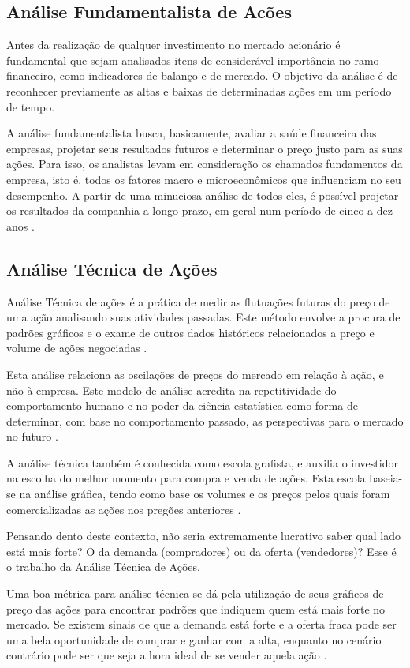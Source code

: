 \subsection{Análise Fundamentalista de Acões}
Antes da realização de qualquer investimento no mercado acionário é fundamental que sejam analisados itens de considerável importância no ramo financeiro, como indicadores de balanço e de mercado. O objetivo da análise é de reconhecer previamente as altas e baixas de determinadas ações em um período de tempo.

A análise fundamentalista busca, basicamente, avaliar a saúde financeira das empresas, projetar seus resultados futuros e determinar o preço justo para as suas ações. Para isso, os analistas levam em consideração os chamados fundamentos da empresa, isto é, todos os fatores macro e microeconômicos que influenciam no seu desempenho. A partir de uma minuciosa análise de todos eles, é possível projetar os resultados da companhia a longo prazo, em geral num período de cinco a dez anos \cite{exame}.

\subsection{Análise Técnica de Ações}\label{ch:analise-tecnica}
Análise Técnica de ações é a prática de medir as flutuações futuras do preço de uma ação analisando suas atividades passadas. Este método envolve a procura de padrões gráficos e o exame de outros dados históricos relacionados a preço e volume de ações negociadas \cite{tororadar}.
 
Esta análise relaciona as oscilações de preços do mercado em relação à ação, e não à empresa. Este modelo de análise acredita na repetitividade do comportamento humano e no poder da ciência estatística como forma de determinar, com base no comportamento passado, as perspectivas para o mercado no futuro \cite{pereira}.

A análise técnica também é conhecida como escola grafista, e auxilia o investidor na escolha do melhor momento para compra e venda de ações. Esta escola baseia-se na análise gráfica, tendo como base os volumes e os preços pelos quais foram comercializadas as ações nos pregões anteriores \cite{fortuna}.

Pensando dento deste contexto, não seria extremamente lucrativo saber qual lado está mais forte? O da demanda (compradores) ou da oferta (vendedores)? Esse é o trabalho da Análise Técnica de Ações.

Uma boa métrica para análise técnica se dá pela utilização de seus gráficos de preço das ações para encontrar padrões que indiquem quem está mais forte no mercado. Se existem sinais de que a demanda está forte e a oferta fraca pode ser uma bela oportunidade de comprar e ganhar com a alta, enquanto no cenário contrário pode ser que seja a hora ideal de se vender aquela ação \cite{tororadar}.

